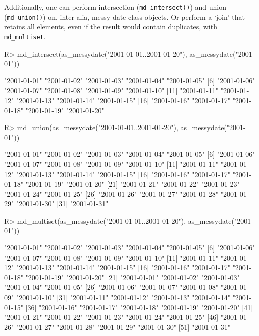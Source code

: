 \documentclass[
]{jss}
\begin{document}
Additionally, one can perform intersection (\texttt{md\_intersect()})
and union (\texttt{md\_union()}) on, inter alia, messy date class
objects. Or perform a `join' that retains all elements, even if the
result would contain duplicates, with \texttt{md\_multiset}.

\begin{CodeChunk}
\begin{CodeInput}
R> md_intersect(as_messydate("2001-01-01..2001-01-20"), as_messydate("2001-01"))
\end{CodeInput}
\begin{CodeOutput}
 [1] "2001-01-01" "2001-01-02" "2001-01-03" "2001-01-04" "2001-01-05"
 [6] "2001-01-06" "2001-01-07" "2001-01-08" "2001-01-09" "2001-01-10"
[11] "2001-01-11" "2001-01-12" "2001-01-13" "2001-01-14" "2001-01-15"
[16] "2001-01-16" "2001-01-17" "2001-01-18" "2001-01-19" "2001-01-20"
\end{CodeOutput}
\begin{CodeInput}
R> md_union(as_messydate("2001-01-01..2001-01-20"), as_messydate("2001-01"))
\end{CodeInput}
\begin{CodeOutput}
 [1] "2001-01-01" "2001-01-02" "2001-01-03" "2001-01-04" "2001-01-05"
 [6] "2001-01-06" "2001-01-07" "2001-01-08" "2001-01-09" "2001-01-10"
[11] "2001-01-11" "2001-01-12" "2001-01-13" "2001-01-14" "2001-01-15"
[16] "2001-01-16" "2001-01-17" "2001-01-18" "2001-01-19" "2001-01-20"
[21] "2001-01-21" "2001-01-22" "2001-01-23" "2001-01-24" "2001-01-25"
[26] "2001-01-26" "2001-01-27" "2001-01-28" "2001-01-29" "2001-01-30"
[31] "2001-01-31"
\end{CodeOutput}
\begin{CodeInput}
R> md_multiset(as_messydate("2001-01-01..2001-01-20"), as_messydate("2001-01"))
\end{CodeInput}
\begin{CodeOutput}
 [1] "2001-01-01" "2001-01-02" "2001-01-03" "2001-01-04" "2001-01-05"
 [6] "2001-01-06" "2001-01-07" "2001-01-08" "2001-01-09" "2001-01-10"
[11] "2001-01-11" "2001-01-12" "2001-01-13" "2001-01-14" "2001-01-15"
[16] "2001-01-16" "2001-01-17" "2001-01-18" "2001-01-19" "2001-01-20"
[21] "2001-01-01" "2001-01-02" "2001-01-03" "2001-01-04" "2001-01-05"
[26] "2001-01-06" "2001-01-07" "2001-01-08" "2001-01-09" "2001-01-10"
[31] "2001-01-11" "2001-01-12" "2001-01-13" "2001-01-14" "2001-01-15"
[36] "2001-01-16" "2001-01-17" "2001-01-18" "2001-01-19" "2001-01-20"
[41] "2001-01-21" "2001-01-22" "2001-01-23" "2001-01-24" "2001-01-25"
[46] "2001-01-26" "2001-01-27" "2001-01-28" "2001-01-29" "2001-01-30"
[51] "2001-01-31"
\end{CodeOutput}
\end{CodeChunk}
\end{document}
